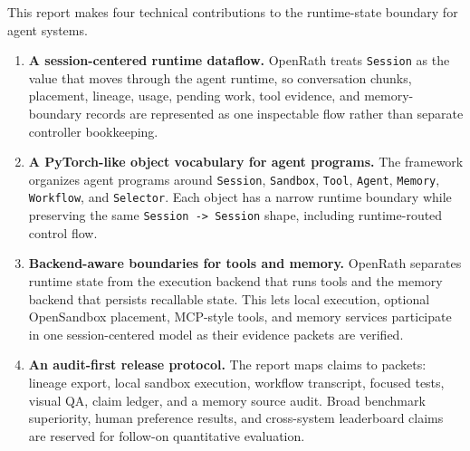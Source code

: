 
This report makes four technical contributions to the runtime-state boundary
for agent systems.

\begin{enumerate}[itemsep=0.1em, topsep=0.2em]
  \item \textbf{A session-centered runtime dataflow.}
  OpenRath treats \texttt{Session} as the value that moves through the agent
  runtime, so conversation chunks, placement, lineage, usage, pending work,
  tool evidence, and memory-boundary records are represented as one inspectable
  flow rather than separate controller bookkeeping.

  \item \textbf{A PyTorch-like object vocabulary for agent programs.}
  The framework organizes agent programs around
  \texttt{Session}, \texttt{Sandbox}, \texttt{Tool}, \texttt{Agent},
  \texttt{Memory}, \texttt{Workflow}, and \texttt{Selector}. Each object has a
  narrow runtime boundary while preserving the same \texttt{Session -> Session}
  shape, including runtime-routed control flow.

  \item \textbf{Backend-aware boundaries for tools and memory.}
  OpenRath separates runtime state from the execution backend that runs tools
  and the memory backend that persists recallable state. This lets local
  execution, optional OpenSandbox placement, MCP-style tools, and memory
  services participate in one session-centered model as their evidence packets
  are verified.

  \item \textbf{An audit-first release protocol.}
  The report maps claims to packets: lineage export, local sandbox execution,
  workflow transcript, focused tests, visual QA, claim ledger, and a
  memory source audit. Broad benchmark superiority, human preference
  results, and cross-system leaderboard claims are reserved for follow-on
  quantitative evaluation.
\end{enumerate}
